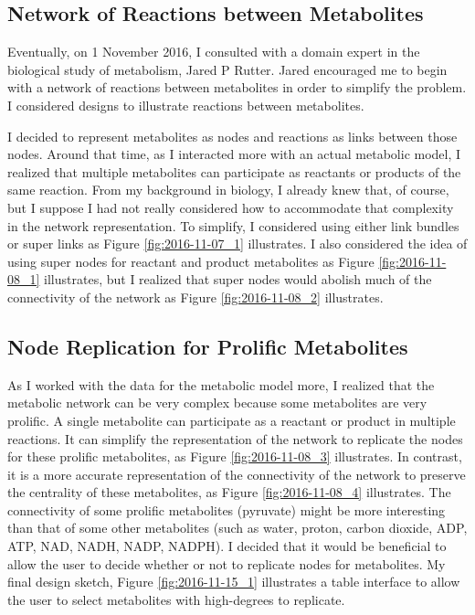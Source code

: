 \subsection{Network of Reactions between Metabolites}

Eventually, on 1 November 2016, I consulted with a domain expert in the biological study of metabolism, Jared P Rutter.
Jared encouraged me to begin with a network of reactions between metabolites in order to simplify the problem.
I considered designs to illustrate reactions between metabolites.

I decided to represent metabolites as nodes and reactions as links between those nodes.
Around that time, as I interacted more with an actual metabolic model, I realized that multiple metabolites can participate as reactants or products of the same reaction.
From my background in biology, I already knew that, of course, but I suppose I had not really considered how to accommodate that complexity in the network representation.
To simplify, I considered using either link bundles or super links as Figure \ref{fig:2016-11-07_1} illustrates.
I also considered the idea of using super nodes for reactant and product metabolites as Figure \ref{fig:2016-11-08_1} illustrates, but I realized that super nodes would abolish much of the connectivity of the network as Figure \ref{fig:2016-11-08_2} illustrates.

\subsection{Node Replication for Prolific Metabolites}

As I worked with the data for the metabolic model more, I realized that the metabolic network can be very complex because some metabolites are very prolific.
A single metabolite can participate as a reactant or product in multiple reactions.
It can simplify the representation of the network to replicate the nodes for these prolific metabolites, as Figure \ref{fig:2016-11-08_3} illustrates.
In contrast, it is a more accurate representation of the connectivity of the network to preserve the centrality of these metabolites, as Figure \ref{fig:2016-11-08_4} illustrates.
The connectivity of some prolific metabolites (pyruvate) might be more interesting than that of some other metabolites (such as water, proton, carbon dioxide, ADP, ATP, NAD, NADH, NADP, NADPH).
I decided that it would be beneficial to allow the user to decide whether or not to replicate nodes for metabolites.
My final design sketch, Figure \ref{fig:2016-11-15_1} illustrates a table interface to allow the user to select metabolites with high-degrees to replicate.

